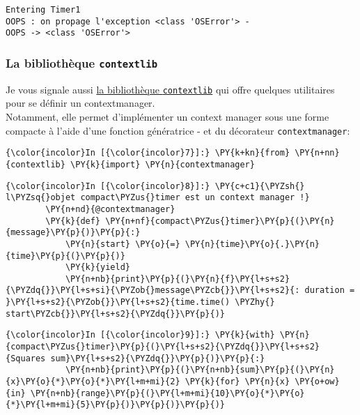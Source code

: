     \begin{Verbatim}[commandchars=\\\{\}]
Entering Timer1
OOPS : on propage l'exception <class 'OSError'> - 
OOPS -> <class 'OSError'>

    \end{Verbatim}

    \hypertarget{la-bibliothuxe8que-contextlib}{%
\subsubsection{\texorpdfstring{La bibliothèque
\texttt{contextlib}}{La bibliothèque contextlib}}\label{la-bibliothuxe8que-contextlib}}

    Je vous signale aussi
\href{https://docs.python.org/3/library/contextlib.html}{la bibliothèque
\texttt{contextlib}} qui offre quelques utilitaires pour se définir un
contextmanager.\\

Notamment, elle permet d'implémenter un context manager sous une forme
compacte à l'aide d'une fonction génératrice - et du décorateur
\texttt{contextmanager}:

    \begin{Verbatim}[commandchars=\\\{\}]
{\color{incolor}In [{\color{incolor}7}]:} \PY{k+kn}{from} \PY{n+nn}{contextlib} \PY{k}{import} \PY{n}{contextmanager}
\end{Verbatim}


    \begin{Verbatim}[commandchars=\\\{\}]
{\color{incolor}In [{\color{incolor}8}]:} \PY{c+c1}{\PYZsh{} l\PYZsq{}objet compact\PYZus{}timer est un context manager !}
        \PY{n+nd}{@contextmanager}
        \PY{k}{def} \PY{n+nf}{compact\PYZus{}timer}\PY{p}{(}\PY{n}{message}\PY{p}{)}\PY{p}{:}
            \PY{n}{start} \PY{o}{=} \PY{n}{time}\PY{o}{.}\PY{n}{time}\PY{p}{(}\PY{p}{)}
            \PY{k}{yield}
            \PY{n+nb}{print}\PY{p}{(}\PY{n}{f}\PY{l+s+s2}{\PYZdq{}}\PY{l+s+si}{\PYZob{}message\PYZcb{}}\PY{l+s+s2}{: duration = }\PY{l+s+s2}{\PYZob{}}\PY{l+s+s2}{time.time() \PYZhy{} start\PYZcb{}}\PY{l+s+s2}{\PYZdq{}}\PY{p}{)}
\end{Verbatim}


    \begin{Verbatim}[commandchars=\\\{\}]
{\color{incolor}In [{\color{incolor}9}]:} \PY{k}{with} \PY{n}{compact\PYZus{}timer}\PY{p}{(}\PY{l+s+s2}{\PYZdq{}}\PY{l+s+s2}{Squares sum}\PY{l+s+s2}{\PYZdq{}}\PY{p}{)}\PY{p}{:}
            \PY{n+nb}{print}\PY{p}{(}\PY{n+nb}{sum}\PY{p}{(}\PY{n}{x}\PY{o}{*}\PY{o}{*}\PY{l+m+mi}{2} \PY{k}{for} \PY{n}{x} \PY{o+ow}{in} \PY{n+nb}{range}\PY{p}{(}\PY{l+m+mi}{10}\PY{o}{*}\PY{o}{*}\PY{l+m+mi}{5}\PY{p}{)}\PY{p}{)}\PY{p}{)}
\end{Verbatim}


